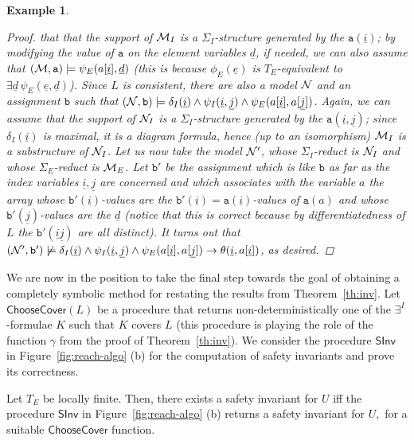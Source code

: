 \documentclass{LMCS}
\newcommand{\ud}{\ensuremath{\underline d}}
\newcommand{\ue}{\ensuremath{\underline e}}
\newcommand{\ui}{\ensuremath{\underline i}}
\newcommand{\uj}{\ensuremath{\underline j}}
\newcommand{\cM}{\ensuremath \mathcal M}
\newcommand{\cN}{\ensuremath \mathcal N}
\theoremstyle{plain}\newtheorem{assumption}[thm]{Assumption}
\theoremstyle{plain}\newtheorem{proposition}[thm]{Proposition}
\theoremstyle{plain}\newtheorem{property}[thm]{Property}
\theoremstyle{plain}\newtheorem{example}[thm]{Example}
\theoremstyle{plain}\newtheorem{claim}[thm]{Claim}
\theoremstyle{plain}\newtheorem{lemma}[thm]{Lemma}
\begin{document}
\begin{example}
\begin{proof}
    that that the support of $\cM_I$ is a $\Sigma_I$-structure
    generated by the $\mathtt{a}(\ui)$; by modifying the value of
    $\mathtt{a}$ on the element variables $\ud$, if needed, we can
    also assume that $(\cM, \mathtt{a})\models\psi_E(a[\ui], \ud)$
    (this is because $\phi_E(\ue)$ is $T_E$-equivalent to $\exists
    \ud\, \psi_E(\ue, \ud)$). Since $L$ is consistent, there are also
    a model $\cN$ and an assignment $\mathtt{b}$ such that $(\cN,
    \mathtt{b})\models \delta_I(\ui)\wedge \psi_I(\ui, \uj)\wedge
    \psi_E(a[\ui], a[\uj])$. Again, we can assume that the support of
    $\cN_I$ is a $\Sigma_I$-structure generated by the
    $\mathtt{a}(\ui, \uj)$; since $\delta_I(\ui)$ is maximal, it is a
    diagram formula, hence (up to an isomorphism) $\cM_I$ is a
    substructure of $\cN_I$. Let us now take the model $\cN'$, whose
    $\Sigma_I$-reduct is $\cN_I$ and whose $\Sigma_E$-reduct is
    $\cM_E$. Let $\mathtt{b}'$ be the assignment which is like
    $\mathtt{b}$ as far as the index variables $\ui, \uj$ are
    concerned and which associates with the variable $a$ the array
    whose $\mathtt{b}'(\ui)$-values are the
    $\mathtt{b}'(\ui)=\mathtt{a}(\ui)$-values of $\mathtt{a}(a)$ and
    whose $\mathtt{b}'(\uj)$-values are the $\ud$ (notice that this is
    correct because by differentiatedness of $L$ the
    $\mathtt{b}'(\ui\uj)$ are all distinct). It turns out that $(\cN',
    \mathtt{b}')\not \models \delta_I(\ui)\wedge \psi_I(\ui,
    \uj)\wedge \psi_E(a[\ui], a[\uj]) \to \theta(\ui, a[\ui])$, as
    desired.
\end{proof}
\end{example}
We are now in the position to take the final step towards the goal of
obtaining a completely symbolic method for
restating
the results from Theorem~\ref{th:inv}.  Let $\mathsf{ChooseCover}(L)$
be a procedure that returns non-deterministically one of the
$\exists^I$-formulae $K$ such that $K$ covers $L$ (this procedure is
playing the role of the function $\gamma$ from the proof of
Theorem~\ref{th:inv}).  We consider the procedure $\mathsf{SInv}$ in
Figure~\ref{fig:reach-algo} (b) for the computation of safety
invariants and prove its correctness.
\begin{thm}
  \label{th:invsymb}
  Let $T_E$ be locally finite. Then, there exists a safety invariant
  for $U$ iff the procedure $\mathsf{SInv}$ in
  Figure~\ref{fig:reach-algo} (b) returns a safety invariant for $U,$
  for a suitable $\mathsf{ChooseCover}$ function.
\end{thm}
\end{document}
